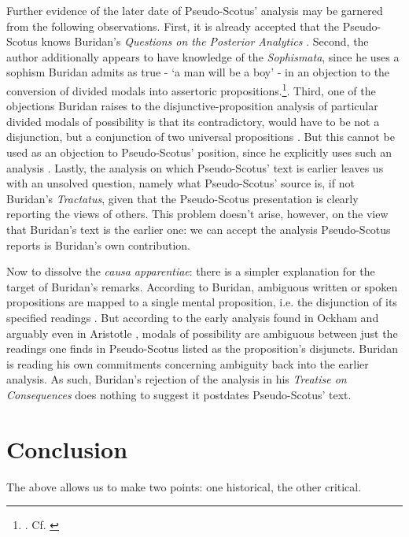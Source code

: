\documentclass[]{article}
\begin{document}
Further evidence of the later date of Pseudo-Scotus' analysis may be garnered from the following observations. First, it is already accepted that the Pseudo-Scotus knows Buridan's \textit{Questions on the Posterior Analytics} \cite[pp. 4-5]{Read2015}. Second, the author additionally appears to have knowledge of the \textit{Sophismata}, since he uses a sophism Buridan admits as true - `a man will be a boy' - in an objection to the conversion of divided modals into assertoric propositions.\footnote{\cite[in. anal. pr. I, q. 26, p. 143]{Pseudo-Scotus1891}. Cf. \cite[pp. 878, 888]{BuridanKlimaSD}}. Third, one of the objections Buridan raises to the disjunctive-proposition analysis of particular divided modals of possibility is that its contradictory, would have to be not a disjunction, but a conjunction of two universal propositions \cite[TC II, 4, p. 98]{Buridan2015}. But this cannot be used as an objection to Pseudo-Scotus' position, since he explicitly uses such an analysis \cite[in anal. pr. q. 26, p. 144]{Pseudo-Scotus1891}. Lastly, the analysis on which Pseudo-Scotus' text is earlier leaves us with an unsolved question, namely what Pseudo-Scotus' source is, if not Buridan's \textit{Tractatus}, given that the Pseudo-Scotus presentation is clearly reporting the views of others. This problem doesn't arise, however, on the view that Buridan's text is the earlier one: we can accept the analysis Pseudo-Scotus reports is Buridan's own contribution.

Now to dissolve the \textit{causa apparentiae}: there is a simpler explanation for the target of Buridan's remarks. According to Buridan, ambiguous written or spoken propositions are mapped to a single mental proposition, i.e. the disjunction of its specified readings \cite[QE 3.2]{BuridanQE}. But according to the early analysis found in Ockham \cite[SL II, ch. 25]{OckhamSLI} \cite{PriestRead1981} and arguably even in Aristotle \cite[Pr. An. 19, 32B 25-32]{AristotlePrA} \cite[pp. 243-245]{Johnston2015}, modals of possibility are ambiguous between just the readings one finds in Pseudo-Scotus listed as the proposition's disjuncts. Buridan is reading his own commitments concerning ambiguity back into the earlier analysis. As such, Buridan's rejection of the analysis in his \textit{Treatise on Consequences} does nothing to suggest it postdates Pseudo-Scotus' text.
\section{Conclusion}
The above allows us to make two points: one historical, the other critical.
\end{document}
